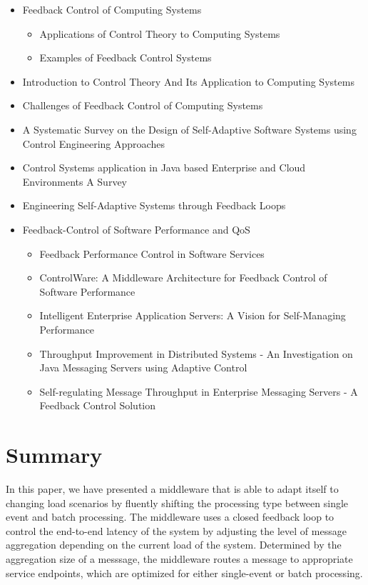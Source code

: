 \begin{itemize}
	\item Feedback Control of Computing Systems \citep{Hellerstein:2004a}
	\begin{itemize}
		\item Applications of Control Theory to Computing Systems
		\item Examples of Feedback Control Systems
	\end{itemize}
	\item Introduction to Control Theory And Its Application to Computing Systems \citep{Abdelzaher:2008ub}
	\item Challenges of Feedback Control of Computing Systems \citep{Hellerstein:2004tu}
	\item A Systematic Survey on the Design of Self-Adaptive Software Systems using Control Engineering Approaches \citep{Patikirikorala:2012ky}
	\item Control Systems application in Java based Enterprise and Cloud Environments \- A Survey \citep{Gullapalli:2011vn}
	\item Engineering Self-Adaptive Systems through Feedback Loops \citep{Brun:2009ww}
\end{itemize}

\begin{itemize}
	\item Feedback-Control of Software Performance and \ac{QoS}
	\begin{itemize}
		\item Feedback Performance Control in Software Services \citep{Abdelzaher:2003ea}
		\item ControlWare: A Middleware Architecture for Feedback Control of Software Performance \citep{Zhang:2002gf}
		\item Intelligent Enterprise Application Servers: A Vision for Self-Managing Performance \citep{Kumar:2013bw}
		\item Throughput Improvement in Distributed Systems - An Investigation on Java Messaging Servers using Adaptive Control
		\item Self-regulating Message Throughput in Enterprise Messaging Servers - A Feedback Control Solution \citep{Kumar:2012we}
	\end{itemize}
\end{itemize}

\section{Summary}\label{sec:ch5_summary}
In this paper, we have presented a middleware that is able to adapt itself to changing load scenarios by fluently shifting the processing type between single event and batch processing. The middleware uses a closed feedback loop to control the end-to-end latency of the system by adjusting the level of message aggregation depending on the current load of the system. Determined by the aggregation size of a messsage, the middleware routes a message to appropriate service endpoints, which are optimized for either single-event or batch processing.

